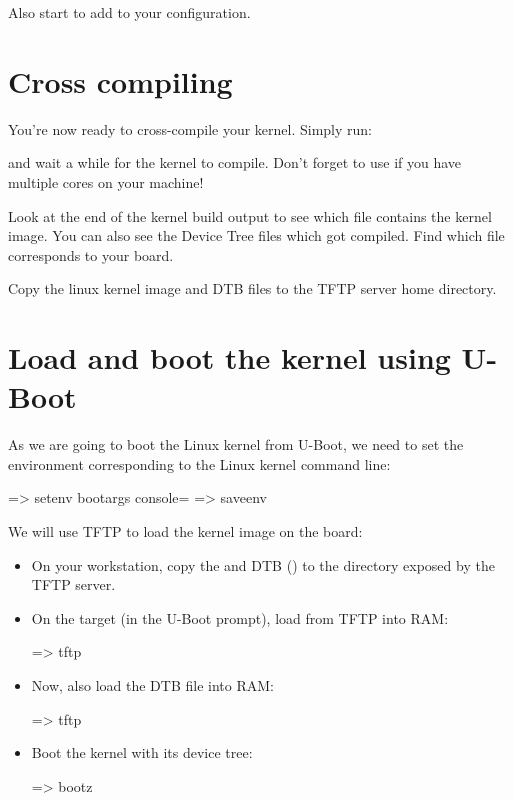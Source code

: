 {Also start  to
add  to your configuration.}
{}

\section{Cross compiling}

You're now ready to cross-compile your kernel. Simply run:


and wait a while for the kernel to compile. Don't forget to use
 if you have multiple cores on your machine!

Look at the end of the kernel build output to see which file contains
the kernel image. You can also see the Device Tree  files
which got compiled. Find which  file corresponds to your
board.

Copy the linux kernel image and DTB files to the TFTP server
home directory.

\section{Load and boot the kernel using U-Boot}

As we are going to boot the Linux kernel from U-Boot,
we need to set the  environment corresponding
to the Linux kernel command line:

\begin{ubootinput}
=> setenv bootargs console=%
=> saveenv
\end{ubootinput}
We will use TFTP to load the kernel image on the board:

\begin{itemize}

\item On your workstation, copy the  and DTB
(\texttt\dtbname) to the directory exposed by the TFTP server.

\item On the target (in the U-Boot prompt), load  from
TFTP into RAM:
\begin{ubootinput}
=> tftp %
\end{ubootinput}

\item Now, also load the DTB file into RAM:
\begin{ubootinput}
=> tftp %
\end{ubootinput}

\item Boot the kernel with its device tree:
\begin{ubootinput}
=> bootz %
\end{ubootinput}

\end{itemize}

